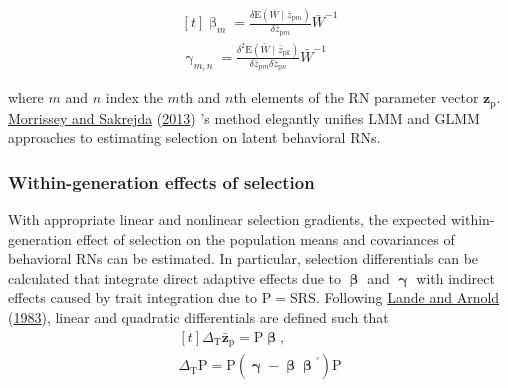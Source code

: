 \documentclass{article}
\begin{document}
\begin{equation} \tag{3}\label{eq:3}
\begin{gathered}[t]
\upbeta _m = \frac{ \delta \mathrm{E} \left( \bar{W} \mid \bar{z}_{\mathrm{p}m}  \right) }{ \delta \bar{z}_{\mathrm{p}m} }  \bar{W}^{-1} \\
\upgamma _{m,n} = \frac{ \delta^2 \mathrm{E} \left( \bar{W} \mid \bar{z}_{\mathrm{p}k}  \right) }{ \delta \bar{z}_{\mathrm{p}m} \delta \bar{z}_{\mathrm{p}n} }  \bar{W}^{-1} \nonumber
\end{gathered}
\end{equation}

where \(m\) and \(n\) index the \(m\)th and \(n\)th elements of the RN
parameter vector \(\boldsymbol{z}_{\boldsymbol{\mathrm{p}}}\).
\protect\hyperlink{ref-Morrissey2013}{Morrissey and Sakrejda}
(\protect\hyperlink{ref-Morrissey2013}{2013}) 's method elegantly
unifies LMM and GLMM approaches to estimating selection on latent
behavioral RNs.

\hypertarget{within-generation-effects-of-selection}{%
\subsubsection{Within-generation effects of
selection}\label{within-generation-effects-of-selection}}

With appropriate linear and nonlinear selection gradients, the expected
within-generation effect of selection on the population means and
covariances of behavioral RNs can be estimated. In particular, selection
differentials can be calculated that integrate direct adaptive effects
due to \(\boldsymbol{ \upbeta}\) and \(\boldsymbol{ \upgamma }\) with
indirect effects caused by trait integration due to
\(\boldsymbol{\mathrm{P}}=\boldsymbol{\mathrm{S}}\boldsymbol{\mathrm{R}}\boldsymbol{\mathrm{S}}\).
Following \protect\hyperlink{ref-Lande1983}{Lande and Arnold}
(\protect\hyperlink{ref-Lande1983}{1983}), linear and quadratic
differentials are defined such that
\begin{equation} \tag{4.1}\label{eq:4.1}
\begin{gathered}[t]
\Delta_{\mathrm{T}} \bar{\boldsymbol{z}}_{\boldsymbol{\mathrm{p}}} =
\boldsymbol{\mathrm{P}} \boldsymbol{\upbeta}, \\ 
\Delta_{\mathrm{T}} \boldsymbol{\mathrm{P}} = \boldsymbol{\mathrm{P}} \left( \boldsymbol{\upgamma} - \boldsymbol{ \upbeta \upbeta }^{'} \right) \boldsymbol{\mathrm{P}} \nonumber
\end{gathered}
\end{equation}
\end{document}
